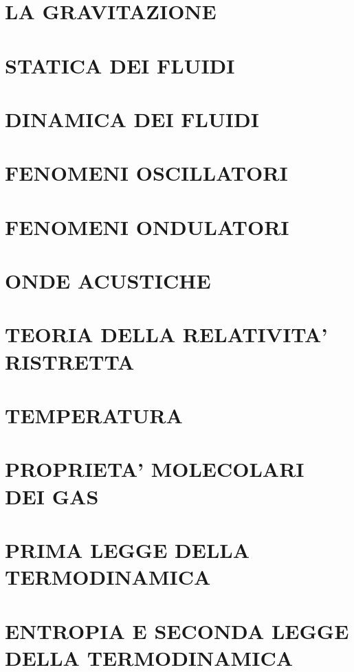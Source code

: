 \documentclass{article}
\begin{document}
	\section{LA GRAVITAZIONE}
	\section{STATICA DEI FLUIDI}
	\section{DINAMICA DEI FLUIDI}
	\section{FENOMENI OSCILLATORI}
	\section{FENOMENI ONDULATORI}
	\section{ONDE ACUSTICHE}
	\section{TEORIA DELLA RELATIVITA' RISTRETTA}
	\section{TEMPERATURA}
	\section{PROPRIETA' MOLECOLARI DEI GAS}
	\section{PRIMA LEGGE DELLA TERMODINAMICA}
	\section{ENTROPIA E SECONDA LEGGE DELLA TERMODINAMICA}
\end{document}
